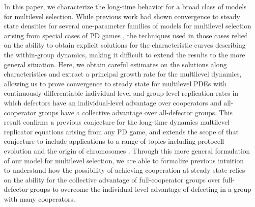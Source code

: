 \documentclass[11pt]{article}
\numberwithin{equation}{section}
\newcommand{\myindent}{\hspace{10mm}}
\begin{document}
{\myindent In this paper, we characterize the long-time behavior for a broad class of models for multilevel selection. While previous work had shown convergence to steady state densities for several one-parameter families of models for multilevel selection arising from special cases of PD games \cite{luo2017scaling,cooney2019replicator}, the techniques used in those cases relied on the ability to obtain explicit solutions for the characteristic curves describing the within-group dynamics,  making it difficult to extend the results to the more general situation. Here, we obtain careful estimates on the solutions along characteristics and extract a principal growth rate for the multilevel dynamics, allowing us to prove convergence to steady state for multilevel PDEs with continuously differentiable individual-level and group-level replication rates in which defectors have an individual-level advantage over cooperators and all-cooperator groups have a collective advantage over all-defector groups. This result confirms a previous conjecture for the long-time dynamics multilevel replicator equations arising from any PD game, and extends the scope of that conjecture to include applications to a range of topics including protocell evolution and the origin of chromosomes \cite{cooney2021pde}. Through this more general formulation of our model for multilevel selection, we are able to formalize previous intuition to understand how the possibility of achieving cooperation at steady state relies on the ability for the collective advantage of full-cooperator groups over full-defector groups to overcome the individual-level advantage of defecting in a group with many cooperators. %


}
\end{document}
